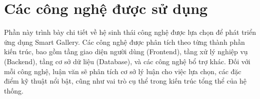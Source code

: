 \section{Các công nghệ được sử dụng}

Phần này trình bày chi tiết về hệ sinh thái công nghệ được lựa chọn để phát triển ứng dụng Smart Gallery. Các công nghệ được phân tích theo từng thành phần kiến trúc, bao gồm tầng giao diện người dùng (Frontend), tầng xử lý nghiệp vụ (Backend), tầng cơ sở dữ liệu (Database), và các công nghệ bổ trợ khác. Đối với mỗi công nghệ, luận văn sẽ phân tích cơ sở lý luận cho việc lựa chọn, các đặc điểm kỹ thuật nổi bật, cũng như vai trò cụ thể trong kiến trúc tổng thể của hệ thống.




